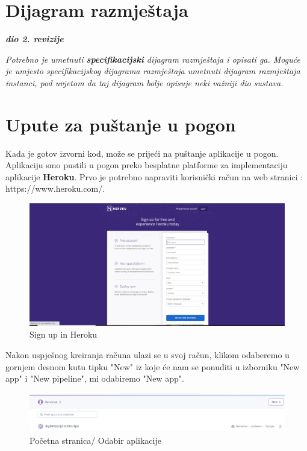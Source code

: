 			\eject 
		
		
		\section{Dijagram razmještaja}
			
			\textbf{\textit{dio 2. revizije}}
			
			 \textit{Potrebno je umetnuti \textbf{specifikacijski} dijagram razmještaja i opisati ga. Moguće je umjesto specifikacijskog dijagrama razmještaja umetnuti dijagram razmještaja instanci, pod uvjetom da taj dijagram bolje opisuje neki važniji dio sustava.}
			
			\eject 
		
		\section{Upute za puštanje u pogon}
		
				
			 \text Kada je gotov izvorni kod, može se prijeći na puštanje aplikacije u pogon. Aplikaciju smo pustili u pogon preko besplatne platforme za implementaciju aplikacije \textbf{Heroku}. Prvo je potrebno napraviti korisnički račun na web stranici : https://www.heroku.com/. 
			 \begin{figure}[H]
			 	\includegraphics[scale=0.4]{slike/heroku sign up.png} 
			 	\centering
			 	\caption{Sign up in Heroku}
			 	\label{DS}
			 \end{figure}
			 
			 Nakon uspješnog kreiranja računa ulazi se u svoj račun, klikom odaberemo u gornjem desnom kutu tipku "New" iz koje će nam se ponuditi u izborniku "New app" i "New pipeline", mi odabiremo "New app".
			 
			 \begin{figure}[H]
			 	\includegraphics[scale=0.5]{slike/odabir aplikacije.png} 
			 	\centering
			 	\caption{Početna stranica/ Odabir aplikacije}
			 	\label{DS}
			 \end{figure}
			 
